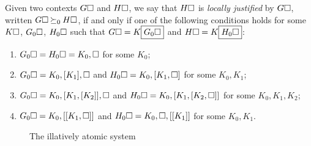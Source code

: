 \begin{definition}

  Given two contexts $G\square$ and $H\square$, we say that $H\square$ is
  \emph{locally justified} by $G\square$, written $G\square \mathbin{\succeq_0} H\square$, if and
  only if one of the following conditions holds for some $K\square$, $G_0\square$,
  $H_0\square$ such that $G\square = K\fbox{$G_0\square$}$ and $H\square =
  K\fbox{$H_0\square$}$:
  \begin{enumerate}
    \item $G_0\square = H_0\square = K_0, \square$ for some $K_0$;
    \item $G_0\square = K_0, [K_1], \square$ and $H_0\square = K_0, [K_1, \square]$ for
    some $K_0, K_1$;
    \item $G_0\square = K_0, [K_1, [K_2]], \square$ and $H_0\square = K_0, [K_1, [K_2,
    \square]]$ for some $K_0, K_1, K_2$;
    \item $G_0\square = K_0, [[K_1, \square]]$ and $H_0\square = K_0, \square, [[K_1]]$
    for some $K_0, K_1$.
  \end{enumerate}
\end{definition}

\begin{figure}
  
  \caption{The illatively atomic system }
\end{figure}

